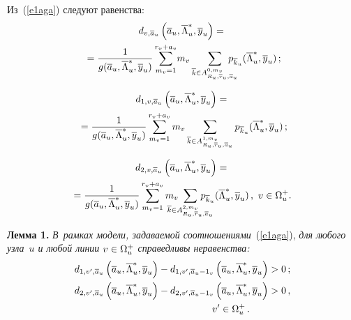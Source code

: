 \begin{multicols}{2}
     Из~(\ref{e1aga}) следуют равенства:
     \begin{multline}
     d_{v,\overline{a}_u} \left( \overline{a}_u, \overline{\Lambda}_u^*, 
\overline{y}_u\right) ={}\\
{}= \fr{1}{g(\overline{a}_u, \overline{\Lambda}_u^*, 
\overline{y}_u)}\sum\limits_{m_v=1}^{r_v+a_v}\! m_v
\sum\limits_{\overline{k}\in A^{0,m_v}_{R_u, \overline{r}_u, 
\overline{a}_u} } \!\!\!\!\!\!\! p_{\overline{k}_u}(\overline{\Lambda}_u^*,\overline{y}_u)\,; 
     \label{e5aga}
     \end{multline}
     
     \vspace*{-9pt}
     
     \noindent
     \begin{multline*}
     d_{1,v,\overline{a}_u} \left( \overline{a}_u, \overline{\Lambda}_u^*, 
\overline{y}_u\right) ={}\\
{}= \displaystyle\frac{\displaystyle 1\mathstrut}{\displaystyle g(\overline{a}_u, \overline{\Lambda}_u^*, 
\overline{y}_u)\mathstrut}\sum\limits_{m_v=1}^{r_v+a_v} m_v
\sum\limits_{\overline{k}\in A^{1,m_v}_{R_u, \overline{r}_u, 
\overline{a}_u} }  p_{\overline{k}_u}(\overline{\Lambda}_u^*,\overline{y}_u)\,; 
\end{multline*}

\vspace*{-9pt}

\noindent
\begin{multline*}
     d_{2,v, \overline{a}_u} \left( \overline{a}_u, \overline{\Lambda}_u^*, 
\overline{y}_u\right) ={}\\
\hspace*{-3pt}{}= \fr{1}{g(\overline{a}_u, \overline{\Lambda}_u^*, 
\overline{y}_u)}\sum\limits_{m_v=1}^{r_v+a_v} m_v
\!\!\!\!\!\!\!\!\sum\limits_{\overline{k}\in A^{2,m_v}_{R_u, \overline{r}_u, 
\overline{a}_u} } \!\!\!\!\!\!\!\!\! p_{\overline{k}_u}(\overline{\Lambda}_u^*,\overline{y}_u)\,, 
\ v\in\Omega_u^+.
\end{multline*}
     
     \noindent
     \textbf{Лемма 1.} \textit{В~рамках модели, задаваемой 
соотношениями}~(\ref{e1aga}), \textit{для любого узла~$u$ и любой линии 
$v\hm\in\Omega_u^+$ справедливы неравенства:}
     \begin{gather*}
     d_{1,v^\prime, \overline{a}_{u}}\left( \overline{a}_u, 
\overline{\Lambda}_u^*, \overline{y}_u\right) -d_{1,v^\prime, \overline{a}_u-
1_v}\left( \overline{a}_u, \overline{\Lambda}_u^*, 
\overline{y}_u\right)>0\,;\\
 d_{2,v^\prime, \overline{a}_{u}}\left( \overline{a}_u, 
\overline{\Lambda}_u^*, \overline{y}_u\right) -d_{2,v^\prime, \overline{a}_u-
1_v}\left( \overline{a}_u, \overline{\Lambda}_u^*, 
\overline{y}_u\right)>0\,,\\
\hspace*{35mm}v^\prime\in \Omega_u^+\,.
     \end{gather*}
     

\end{multicols}
